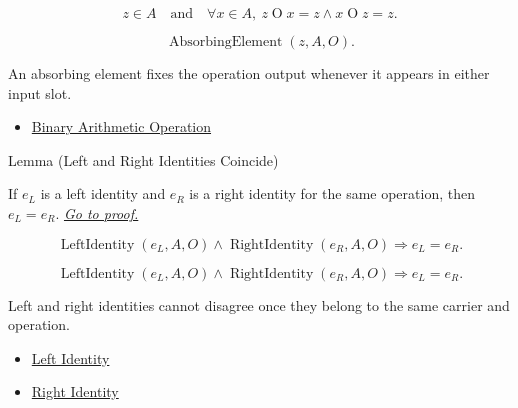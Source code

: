 \begin{remark*}
\[
z\in A
\quad\text{and}\quad
\forall x\in A,\ z\mathbin{O}x=z \land x\mathbin{O}z=z.
\]
\end{remark*}

\begin{remark*}
\[
\operatorname{AbsorbingElement}(z,A,O).
\]
\end{remark*}

\begin{remark*}[Interpretation]
An absorbing element fixes the operation output whenever it appears in either
input slot.
\end{remark*}

\begin{dependencies}
\begin{itemize}
  \item \hyperref[def:binary-arithmetic-operation]{Binary Arithmetic Operation}
\end{itemize}
\end{dependencies}

\begin{lemmabox}{Lemma (Left and Right Identities Coincide)}
\begin{lemma}
\label{lem:left-right-identities-coincide}
If $e_L$ is a left identity and $e_R$ is a right identity for the same
operation, then $e_L=e_R$.
\hyperref[prf:left-right-identities-coincide]{\textit{Go to proof.}}
\end{lemma}
\end{lemmabox}

\begin{remark*}
\[
\operatorname{LeftIdentity}(e_L,A,O)
\land
\operatorname{RightIdentity}(e_R,A,O)
\Longrightarrow e_L=e_R.
\]
\end{remark*}

\begin{remark*}
\[
\operatorname{LeftIdentity}(e_L,A,O)
\land
\operatorname{RightIdentity}(e_R,A,O)
\Longrightarrow e_L=e_R.
\]
\end{remark*}

\begin{remark*}[Interpretation]
Left and right identities cannot disagree once they belong to the same carrier
and operation.
\end{remark*}

\begin{dependencies}
\begin{itemize}
  \item \hyperref[def:left-identity]{Left Identity}
  \item \hyperref[def:right-identity]{Right Identity}
\end{itemize}
\end{dependencies}


